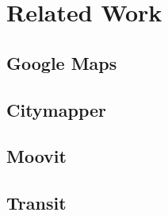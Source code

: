 \chapter{Related Work}
\label{cha:RelatedWork}

\section{Google Maps}
\section{Citymapper}
\section{Moovit}
\section{Transit}
